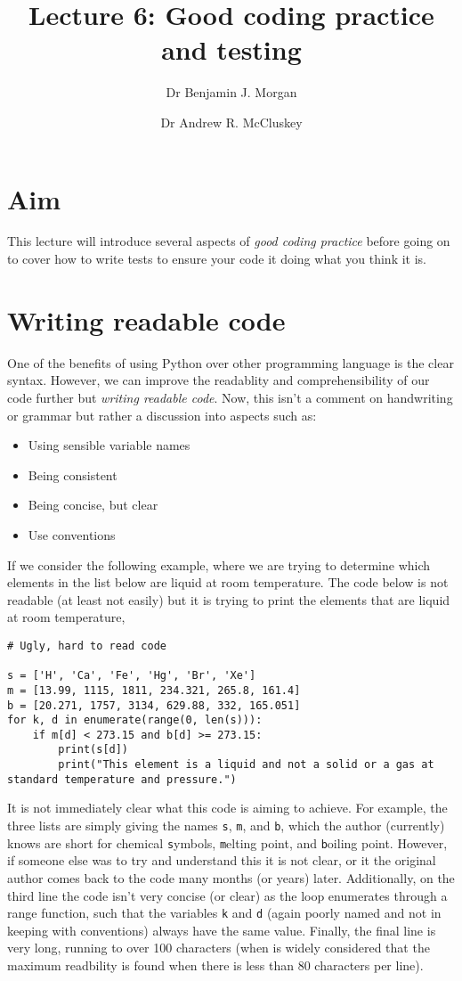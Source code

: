 \documentclass[a4paper]{article}
\title{Lecture 6: Good coding practice and testing}
\author[1]{Dr Benjamin J. Morgan}
\author[1,2]{Dr Andrew R. McCluskey}
\affil[1]{Department of Chemistry, University of Bath, email: b.j.morgan@bath.ac.uk}
\affil[2]{Diamond Light Source, email: andrew.mccluskey@diamond.ac.uk}
\begin{document}
\maketitle

\section*{Aim}
This lecture will introduce several aspects of \emph{good coding practice} before going on to cover how to write tests to ensure your code it doing what you think it is.

\section{Writing readable code}
One of the benefits of using Python over other programming language is the clear syntax.
However, we can improve the readablity and comprehensibility of our code further but \emph{writing readable code}.
Now, this isn't a comment on handwriting or grammar but rather a discussion into aspects such as:
\begin{itemize}
  \item{Using sensible variable names}
  \item{Being consistent}
  \item{Being concise, but clear}
  \item{Use conventions}
\end{itemize}
If we consider the following example, where we are trying to determine which elements in the list below are liquid at room temperature.
The code below is not readable (at least not easily) but it is trying to print the elements that are liquid at room temperature,
\begin{lstlisting}
# Ugly, hard to read code

s = ['H', 'Ca', 'Fe', 'Hg', 'Br', 'Xe']
m = [13.99, 1115, 1811, 234.321, 265.8, 161.4]
b = [20.271, 1757, 3134, 629.88, 332, 165.051]
for k, d in enumerate(range(0, len(s))):
    if m[d] < 273.15 and b[d] >= 273.15:
        print(s[d])
        print("This element is a liquid and not a solid or a gas at standard temperature and pressure.")
\end{lstlisting}
It is not immediately clear what this code is aiming to achieve.
For example, the three lists are simply giving the names \texttt{s}, \texttt{m}, and \texttt{b}, which the author (currently) knows are short for chemical \texttt{s}ymbols, \texttt{m}elting point, and \texttt{b}oiling point.
However, if someone else was to try and understand this it is not clear, or it the original author comes back to the code many months (or years) later.
Additionally, on the third line the code isn't very concise (or clear) as the loop enumerates through a range function, such that the variables \texttt{k} and \texttt{d} (again poorly named and not in keeping with conventions) always have the same value.
Finally, the final line is very long, running to over 100 characters (when is widely considered that the maximum readbility is found when there is less than 80 characters per line).
\end{document}
